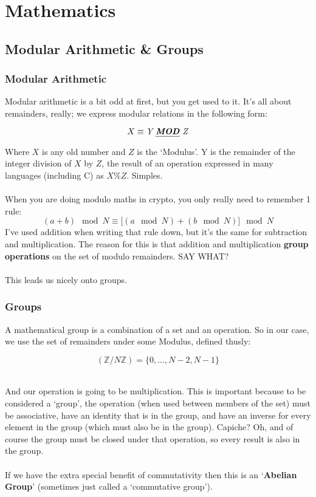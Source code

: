 
\chapter{Mathematics}
    \section{Modular Arithmetic \& Groups}
    \subsection{Modular Arithmetic}
    Modular arithmetic is a bit odd at first, but you get used to it. It's all about remainders, really; we express modular relations in the following form:
    \begin{figure}[htp!]
    \centering
        $$ X \equiv \textit{Y \emph{\textbf{MOD}} Z} $$
    \end{figure}
    Where $X$ is any old number and $Z$ is the `Modulus'. Y is the remainder of the integer division of $X$ by $Z$, the result of an operation expressed in many languages (including C) as $X \% Z$. Simples.\\
    \\
    When you are doing modulo maths in crypto, you only really need to remember 1 rule:
    $$(a+b) \mod N \equiv \big[(a \mod N) + (b \mod N)\big] \mod N$$
    I've used addition when writing that rule down, but it's the same for subtraction and multiplication. The reason for this is that addition and multiplication \textbf{group operations} on the set of modulo remainders. SAY WHAT?\\
    \\
    This leads us nicely onto groups.

    \subsection{Groups}
    A mathematical group is a combination of a set and an operation. So in our case, we use the set of remainders under some Modulus, defined thusly:
    \begin{figure}[htp!]
    $$
        (\mathbb{Z}/N\mathbb{Z}) = \{0,..., N - 2, N - 1 \}
    $$
    \end{figure}\\
    And our operation is going to be multiplication. This is important because to be considered a `group', the operation (when used between members of the set) must be associative, have an identity that is in the group, and have an inverse for every element in the group (which must also be in the group). Capiche? Oh, and of course the group must be closed under that operation, so every result is also in the group.\\
    \\
    If we have the extra special benefit of commutativity then this is an `\textbf{Abelian Group}' (sometimes just called a `commutative group').

